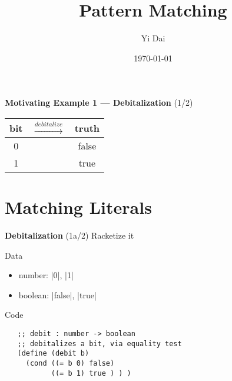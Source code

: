 \documentclass[12pt]{beamer}
\title{\bf Pattern Matching}
\author{Yi Dai}
\date{\today}
\begin{document}
\begin{frame}[plain]
 \maketitle
\end{frame}

\begin{frame}[fragile]{{\bf Motivating Example 1 --- Debitalization} (1/2)}
 \large
 \begin{table}
  \centering
  \begin{tabular}{ccc}
   bit & $\overset{debitalize}{\longrightarrow}$ & truth \\
   \hline
   0   &                                         & false \\
   1   &                                         & true  \\
  \end{tabular}
 \end{table}
\end{frame}

\section{Matching Literals}

\begin{frame}[fragile]{{\bf Debitalization} (1a/2)}
 Racketize it

 \pause

 Data
 \begin{itemize}
  \item number: |0|, |1|
  \item boolean: |false|, |true|
 \end{itemize}

 \pause

 Code
 {\footnotesize
  \begin{verbatim}
   ;; debit : number -> boolean
   ;; debitalizes a bit, via equality test
   (define (debit b)
     (cond ((= b 0) false)
           ((= b 1) true ) ) )
  \end{verbatim}
 }
\end{frame}
\end{document}
